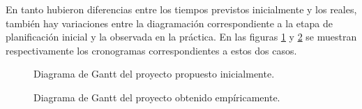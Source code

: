 \documentclass[a4paper, 12pt,twoside]{report}  %
\numberwithin{equation}{subsection} %
\begin{document}
\indent En tanto hubieron diferencias entre los tiempos previstos inicialmente y los reales, también hay variaciones entre la diagramación correspondiente a la etapa de planificación inicial y la observada en la práctica. En las figuras \ref{diagrama de gantt 1} y \ref{diagrama de gantt 2} se muestran respectivamente los cronogramas correspondientes a estos dos casos.

\begin{figure}[H]
	\centering
	{%
		\setlength{\fboxsep}{0pt}%
		\setlength{\fboxrule}{0.5pt}%
	}%
	\caption{Diagrama de Gantt del proyecto propuesto inicialmente.}
	\label{diagrama de gantt 1}
\end{figure}

\begin{figure}[H]
	\centering
	{%
		\setlength{\fboxsep}{0pt}%
		\setlength{\fboxrule}{0.5pt}%
	}%
	\caption{Diagrama de Gantt del proyecto obtenido empíricamente.}
	\label{diagrama de gantt 2}
\end{figure}
\end{document}

